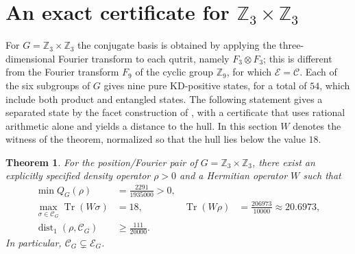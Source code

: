 \documentclass[11pt,a4paper]{article}
\newtheorem{theorem}{Theorem}
\theoremstyle{definition}
\theoremstyle{plain}
\newenvironment{statementframe}{%
  \par\addvspace{0.55\baselineskip}\noindent
  \begingroup\setlength{\fboxrule}{0.3pt}\setlength{\fboxsep}{7pt}%
  \begin{lrbox}{\statementbox}%
  \begin{minipage}{\dimexpr\linewidth-2\fboxsep-2\fboxrule\relax}%
}{%
  \end{minipage}\end{lrbox}%
  {\color{black!45}\fbox{\color{black}\usebox{\statementbox}}}%
  \endgroup\par\addvspace{0.45\baselineskip}%
}
\DeclareMathOperator{\Tr}{Tr}
\DeclareMathOperator{\dist}{dist}
\newcommand{\Z}{\mathbb Z}
\newcommand{\E}{\mathcal E}
\newcommand{\hull}{\mathcal C}
\begin{document}
\section{An exact certificate for $\Z_3\times\Z_3$}\label{sec:z3}
For $G=\Z_3\times\Z_3$ the conjugate basis is obtained by applying the
three-dimensional Fourier transform to each qutrit, namely $F_3\otimes F_3$;
this is different from the Fourier transform $F_9$ of the cyclic group
$\Z_9$, for which $\E=\hull$. Each of the six subgroups of $G$ gives nine
pure KD-positive states, for a total of $54$, which include both product and
entangled states. The following statement gives a separated state by the
facet construction of \cite[Section~7]{DLR}, with a certificate that uses
rational arithmetic alone and yields a distance to the hull. In this section
$W$ denotes the witness of the theorem, normalized so that the hull lies
below the value $18$.

\begin{statementframe}
\begin{theorem}\label{thm:example}
For the position/Fourier pair of $G=\Z_3\times\Z_3$, there exist an explicitly
specified density operator $\rho>0$ and a Hermitian operator $W$ such that
\begin{align}
 \min Q_G(\rho)&=\frac{2291}{1935000}>0,\label{eq:minQ}\\
 \max_{\sigma\in\hull_G}\Tr(W\sigma)&=18,
 &\Tr(W\rho)&=\frac{206973}{10000}\approx20.6973,\label{eq:gap}\\
 \dist_1(\rho,\hull_G)&\geq\frac{111}{20000}.\label{eq:distance}
\end{align}
In particular, $\hull_G\subsetneq\E_G$.
\end{theorem}
\end{statementframe}
\end{document}
